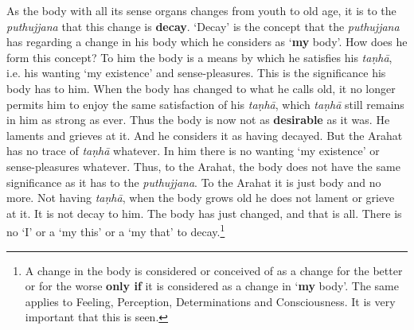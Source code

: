 As the body with all its sense organs changes from youth to old age, it is to the \emph{puthujjana} that this change is \textbf{decay}. `Decay' is the concept that the \emph{puthujjana} has regarding a change in his body which he considers as `\textbf{my} body'. How does he form this concept? To him the body is a means by which he satisfies his \emph{taṇhā}, i.e. his wanting `my existence' and sense-pleasures. This is the significance his body has to him. When the body has changed to what he calls old, it no longer permits him to enjoy the same satisfaction of his \emph{taṇhā}, which \emph{taṇhā} still remains in him as strong as ever. Thus the body is now not as \textbf{desirable} as it was. He laments and grieves at it. And he considers it as having decayed. But the Arahat has no trace of \emph{taṇhā} whatever. In him there is no wanting `my existence' or sense-pleasures whatever. Thus, to the Arahat, the body does not have the same significance as it has to the \emph{puthujjana}. To the Arahat it is just body and no more. Not having \emph{taṇhā}, when the body grows old he does not lament or grieve at it. It is not decay to him. The body has just changed, and that is all. There is no `I' or a `my this' or a `my that' to decay.\footnote{A change in the body is considered or conceived of as a change for the better or for the worse \textbf{only if} it is considered as a change in `\textbf{my} body'. The same applies to Feeling, Perception, Determinations and Consciousness. It is very important that this is seen.}

